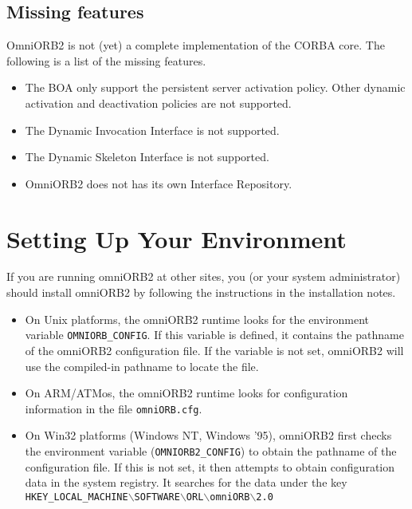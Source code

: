 \documentclass[11pt,twoside,onecolumn]{book}
\begin{document}
\subsection{Missing features}

OmniORB2 is not (yet) a complete implementation of the CORBA core. 
The following is a list of the missing features. 

\begin{itemize}

\item The BOA only support the persistent server activation policy. Other
dynamic activation and deactivation policies are not supported.
\item The Dynamic Invocation Interface is not supported.
\item The Dynamic Skeleton Interface is not supported.
\item OmniORB2 does not has its own Interface Repository.
\end{itemize}



\section{Setting Up Your Environment}


If you are running omniORB2 at other sites, you (or your system
administrator) should install omniORB2 by following the instructions in the
installation notes. 

\begin{itemize}

\item On Unix platforms, the omniORB2 runtime looks for the environment
variable {\tt OMNIORB\_CONFIG}. If this variable is defined, it contains
the pathname of the omniORB2 configuration file. If the variable is not
set, omniORB2 will use the compiled-in pathname to locate the file.

\item On ARM/ATMos, the omniORB2 runtime looks for configuration
information in the file {\tt omniORB.cfg}.

\item On Win32 platforms (Windows NT, Windows '95), omniORB2 first checks the 
environment variable ({\tt OMNIORB2\_CONFIG}) to obtain the pathname of the 
configuration file. If this is not set, it then attempts to obtain 
configuration data in the system registry. It searches for the data under 
the key {\tt HKEY\_LOCAL\_MACHINE$\backslash$SOFTWARE$\backslash$ORL$\backslash$omniORB$\backslash$2.0}

\end{itemize}
\end{document}
